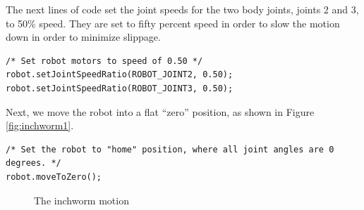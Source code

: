 \documentclass{article}
\begin{document}
The next lines of code set the joint speeds for the two body joints, joints 
2 and 3, to 50\% speed. They are set to fifty percent speed in order to 
slow the motion down in order to minimize slippage.

\begin{verbatim}
/* Set robot motors to speed of 0.50 */
robot.setJointSpeedRatio(ROBOT_JOINT2, 0.50);
robot.setJointSpeedRatio(ROBOT_JOINT3, 0.50);
\end{verbatim}

Next, we move the robot into a flat ``zero'' position, as shown in Figure \ref{fig:inchworm1}.

\begin{verbatim}
/* Set the robot to "home" position, where all joint angles are 0 degrees. */
robot.moveToZero();
\end{verbatim}

\begin{figure}
  \centering
  \caption{The inchworm motion}
  \label{fig:inchworm}
\end{figure}
\end{document}
